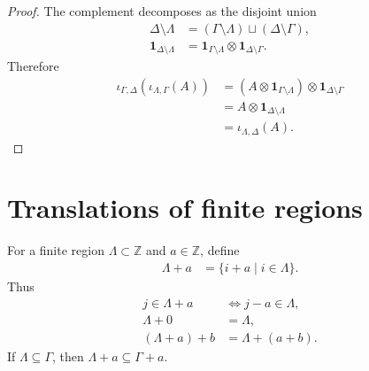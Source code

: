 \begin{proof}\leanok
    The complement decomposes as the disjoint union
    \begin{align}
        \Delta\setminus\Lambda
         & =(\Gamma\setminus\Lambda)\sqcup(\Delta\setminus\Gamma), \\
        \mathbf 1_{\Delta\setminus\Lambda}
         & =\mathbf 1_{\Gamma\setminus\Lambda}
        \otimes\mathbf 1_{\Delta\setminus\Gamma}.
    \end{align}
    Therefore
    \begin{align}
        \iota_{\Gamma,\Delta}(\iota_{\Lambda,\Gamma}(A))
         & =(A\otimes\mathbf 1_{\Gamma\setminus\Lambda})
        \otimes\mathbf 1_{\Delta\setminus\Gamma}         \\
         & =A\otimes\mathbf 1_{\Delta\setminus\Lambda}   \\
         & =\iota_{\Lambda,\Delta}(A).
    \end{align}
\end{proof}

\section{Translations of finite regions}

\begin{definition}
    \label{def:qca_translate_region}
    \leanok
    For a finite region $\Lambda\subset\mathbb Z$ and $a\in\mathbb Z$, define
    \begin{align}
        \Lambda+a & =\{i+a\mid i\in\Lambda\}.
    \end{align}
    Thus
    \begin{align}
        j\in\Lambda+a & \iff j-a\in\Lambda, \\
        \Lambda+0     & =\Lambda,           \\
        (\Lambda+a)+b & =\Lambda+(a+b).
    \end{align}
    If $\Lambda\subseteq\Gamma$, then $\Lambda+a\subseteq\Gamma+a$.
\end{definition}

